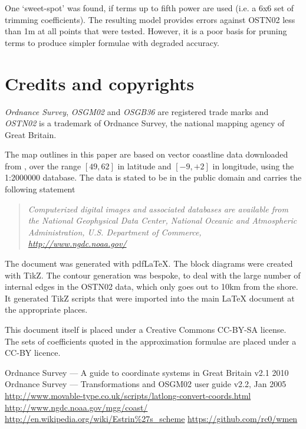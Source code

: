 \documentclass[10pt,a4paper]{article}
\begin{document}
One `sweet-spot' was found, if terms up to fifth power are used (i.e. a 6x6 set
of trimming coefficients).  The resulting model provides errors against OSTN02
less than 1m at all points that were tested.  However, it is a poor basis for
pruning terms to produce simpler formulae with degraded accuracy.

\section {Credits and copyrights}

\textsl{Ordnance Survey}, \textsl{OSGM02} and \textsl{OSGB36} are registered
trade marks and \textsl{OSTN02} is a trademark of Ordnance Survey, the national
mapping agency of Great Britain.

The map outlines in this paper are based on vector coastline data downloaded
from \cite{ngdc}, over the range $[49,62]$ in latitude and $[-9,+2]$ in
longitude, using the 1:2000000 database.  The data is stated to be in the
public domain and carries the following statement
\begin{quote}
\textsl{
Computerized digital images and associated databases are available from the
National Geophysical Data Center, National Oceanic and Atmospheric
Administration, U.S. Department of Commerce, \url{http://www.ngdc.noaa.gov/}}
\end{quote}

The document was generated with pdf\LaTeX.  The block diagrams were created
with TikZ.  The contour generation was bespoke, to deal with the large number
of internal edges in the OSTN02 data, which only goes out to 10km from the
shore.  It generated TikZ scripts that were imported into the main \LaTeX{}
document at the appropriate places.

This document itself is placed under a Creative Commons CC-BY-SA license.  The
sets of coefficients quoted in the approximation formulae are placed under a
CC-BY licence.

\begin{thebibliography}{99}
   Ordnance Survey --- A guide to coordinate systems in Great Britain v2.1 2010
   Ordnance Survey --- Transformations and OSGM02 user guide v2.2, Jan 2005
   \url{http://www.movable-type.co.uk/scripts/latlong-convert-coords.html}
   \url{http://www.ngdc.noaa.gov/mgg/coast/}
   \url{http://en.wikipedia.org/wiki/Estrin%27s_scheme}
   \url{https://github.com/rc0/wmen}
\end{thebibliography}
\end{document}
